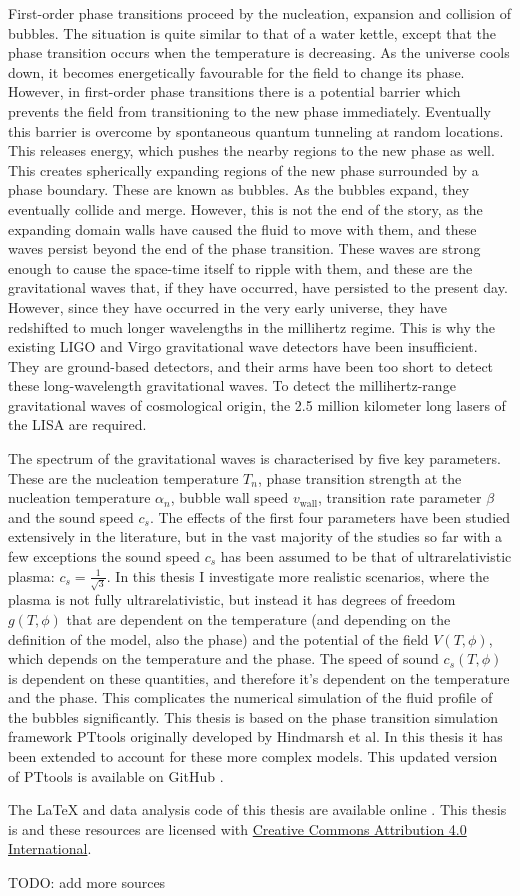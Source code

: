 First-order phase transitions proceed by the nucleation, expansion and collision of bubbles.
The situation is quite similar to that of a water kettle,
except that the phase transition occurs when the temperature is decreasing.
As the universe cools down,
it becomes energetically favourable for the field to change its phase.
However, in first-order phase transitions there is a potential barrier which prevents the field from transitioning to the new phase immediately.
Eventually this barrier is overcome by spontaneous quantum tunneling at random locations.
This releases energy, which pushes the nearby regions to the new phase as well.
This creates spherically expanding regions of the new phase surrounded by a phase boundary.
These are known as bubbles.
As the bubbles expand, they eventually collide and merge.
However, this is not the end of the story,
as the expanding domain walls have caused the fluid to move with them,
and these waves persist beyond the end of the phase transition.
These waves are strong enough to cause the space-time itself to ripple with them,
and these are the gravitational waves that, if they have occurred, have persisted to the present day.
However, since they have occurred in the very early universe, they have redshifted to much longer wavelengths in the millihertz regime.
This is why the existing LIGO and Virgo gravitational wave detectors have been insufficient.
They are ground-based detectors, and their arms have been too short to detect these long-wavelength gravitational waves.
To detect the millihertz-range gravitational waves of cosmological origin, the 2.5 million kilometer long lasers of the LISA are required.
\cite{lecture_notes}

The spectrum of the gravitational waves is characterised by five key parameters.
These are the nucleation temperature $T_n$,
phase transition strength at the nucleation temperature $\alpha_n$,
bubble wall speed $v_{\text{wall}}$,
transition rate parameter $\beta$
and the sound speed $c_s$.
\cite{lecture_notes}
The effects of the first four parameters have been studied extensively in the literature,
but in the vast majority of the studies so far with a few exceptions
\cites{giese_2020}{giese_2021}{tenkanen_speed_2022}{tian_gw_2024}
the sound speed $c_s$ has been assumed to be that of ultrarelativistic plasma: $c_s = \frac{1}{\sqrt{3}}$.
In this thesis I investigate more realistic scenarios, where the plasma is not fully ultrarelativistic,
but instead it has degrees of freedom $g(T,\phi)$ that are dependent on the temperature (and depending on the definition of the model, also the phase) and the potential of the field $V(T,\phi)$,
which depends on the temperature and the phase.
The speed of sound $c_s(T,\phi)$ is dependent on these quantities,
and therefore it's dependent on the temperature and the phase.
This complicates the numerical simulation of the fluid profile of the bubbles significantly.
This thesis is based on the phase transition simulation framework PTtools originally developed by Hindmarsh et al.
In this thesis it has been extended to account for these more complex models.
This updated version of PTtools is available on GitHub \cite{pttools}.

The LaTeX and data analysis code of this thesis are available online \cite{thesis_source}.
This thesis is and these resources are licensed with
\href{https://creativecommons.org/licenses/by/4.0/}{Creative Commons Attribution 4.0 International}.

TODO: add more sources
